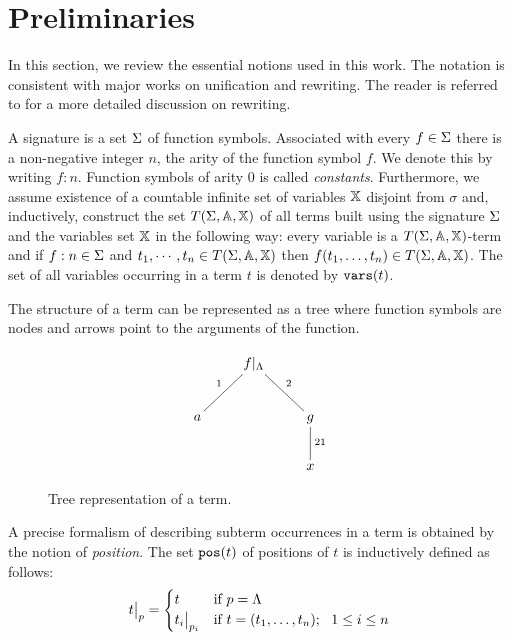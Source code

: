 \section{Preliminaries}
In this section, we review the essential notions used in this work. The notation is consistent with major works on unification and rewriting. The reader is referred to \cite{bezem2003term} for a more detailed discussion on rewriting.

A signature is a set $\Sigma$ of function symbols. Associated with every $f \in \Sigma$ there is a non-negative integer $n$, the arity of the function symbol $f$. We denote this by writing $f:n$. Function symbols of arity $0$ is called \textit{constants}. Furthermore, we assume existence of a countable infinite set of variables $\mathbb{X}$ disjoint from $\sigma$ and, inductively, construct the set $T(\Sigma,\mathbb{A},\mathbb{X})$ of all terms built using the signature $\Sigma$ and the variables set $\mathbb{X}$ in the following way: every variable is a $T(\Sigma,\mathbb{A},\mathbb{X})$-term and if $f:n \in \Sigma$ and $t_1, \cdots, t_n \in T(\Sigma,\mathbb{A},\mathbb{X})$ then $f(t_1, \dots, t_n) \in T(\Sigma,\mathbb{A},\mathbb{X})$. The set of all variables occurring in a term $t$ is denoted by $\mathtt{vars}(t)$.

The structure of a term can be represented as a tree where function symbols are nodes and arrows point to the arguments of the function.
\begin{figure}[!ht]
	\begin{displaymath}
		\xymatrix{
		&f|_\Lambda \ar@{-}^2[dr]\ar@{-}_1[dl]&\\
		a  & & g \ar@{-}^{21}[d] \\
		& &x
		}
	\end{displaymath}
	\caption{Tree representation of a term.}
	\label{figure:tree-representation-of-a-term}
\end{figure}
A precise formalism of describing subterm occurrences in a term is obtained by the notion of \textit{position}. The set $\mathtt{pos}(t)$ of positions of $t$ is inductively defined as follows:
\begin{displaymath}
    \restr{t}{p} =
	\begin{cases}
		t                & \mbox{if } p = \Lambda                               \\
		\restr{t_i}{p_i} & \mbox{if } t = (t_1,\dots, t_n); \ \ 1 \leq i \leq n
	\end{cases}
\end{displaymath}

